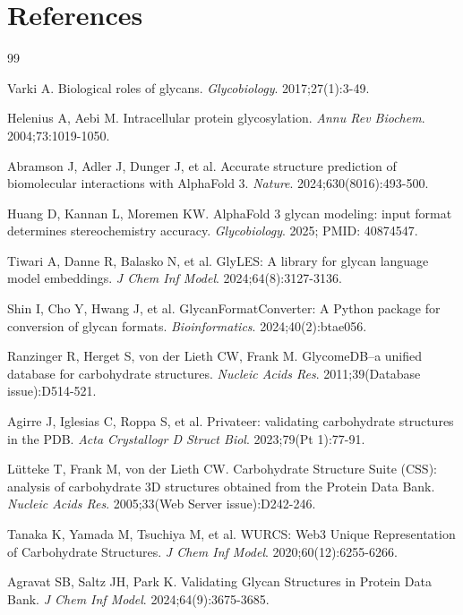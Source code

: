 \section*{References}

\begin{thebibliography}{99}

Varki A. Biological roles of glycans. \textit{Glycobiology}. 2017;27(1):3-49.

Helenius A, Aebi M. Intracellular protein glycosylation. \textit{Annu Rev Biochem}. 2004;73:1019-1050.

Abramson J, Adler J, Dunger J, et al. Accurate structure prediction of biomolecular interactions with AlphaFold 3. \textit{Nature}. 2024;630(8016):493-500.

Huang D, Kannan L, Moremen KW. AlphaFold 3 glycan modeling: input format determines stereochemistry accuracy. \textit{Glycobiology}. 2025; PMID: 40874547.

Tiwari A, Danne R, Balasko N, et al. GlyLES: A library for glycan language model embeddings. \textit{J Chem Inf Model}. 2024;64(8):3127-3136.

Shin I, Cho Y, Hwang J, et al. GlycanFormatConverter: A Python package for conversion of glycan formats. \textit{Bioinformatics}. 2024;40(2):btae056.

Ranzinger R, Herget S, von der Lieth CW, Frank M. GlycomeDB--a unified database for carbohydrate structures. \textit{Nucleic Acids Res}. 2011;39(Database issue):D514-521.

Agirre J, Iglesias C, Roppa S, et al. Privateer: validating carbohydrate structures in the PDB. \textit{Acta Crystallogr D Struct Biol}. 2023;79(Pt 1):77-91.

L\"utteke T, Frank M, von der Lieth CW. Carbohydrate Structure Suite (CSS): analysis of carbohydrate 3D structures obtained from the Protein Data Bank. \textit{Nucleic Acids Res}. 2005;33(Web Server issue):D242-246.

Tanaka K, Yamada M, Tsuchiya M, et al. WURCS: Web3 Unique Representation of Carbohydrate Structures. \textit{J Chem Inf Model}. 2020;60(12):6255-6266.

Agravat SB, Saltz JH, Park K. Validating Glycan Structures in Protein Data Bank. \textit{J Chem Inf Model}. 2024;64(9):3675-3685.

\end{thebibliography}


